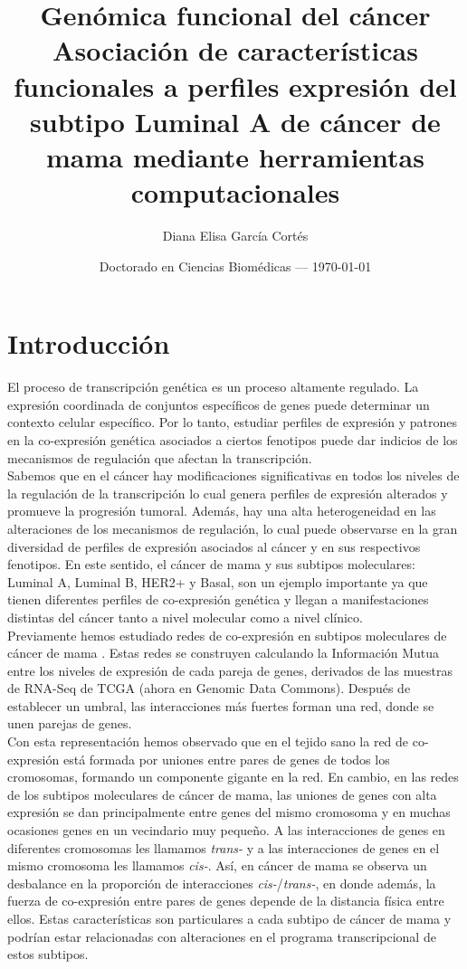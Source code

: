 \documentclass{article}
\title{Genómica funcional del cáncer \\
\large Asociación de características funcionales a perfiles expresión del subtipo Luminal A de cáncer de mama mediante herramientas computacionales} %
\author{Diana Elisa García Cortés\\} %
\date{Doctorado en Ciencias Biomédicas --- \today} %
\begin{document}
\maketitle %


\section*{Introducción}

El proceso de transcripción genética es un proceso altamente regulado. La expresión coordinada de conjuntos específicos de genes puede determinar un contexto celular específico. Por lo tanto, estudiar perfiles de expresión y patrones en la co-expresión genética asociados a ciertos fenotipos puede dar indicios de los mecanismos de regulación que afectan la transcripción. \\
Sabemos que en el cáncer hay modificaciones significativas en todos los niveles de la regulación de la transcripción lo cual genera perfiles de expresión alterados y promueve la progresión tumoral. Además, hay una alta heterogeneidad en las alteraciones de los mecanismos de regulación, lo cual puede observarse en la gran diversidad de perfiles de expresión asociados al cáncer y en sus respectivos fenotipos. En este sentido, el cáncer de mama y sus subtipos moleculares: Luminal A, Luminal B, HER2+ y Basal, son un ejemplo importante ya que tienen diferentes perfiles de co-expresión genética y llegan a manifestaciones distintas del cáncer tanto a nivel molecular como a nivel clínico. \\
Previamente hemos estudiado redes de co-expresión en subtipos moleculares de cáncer de mama \cite{gdc}. Estas redes se construyen calculando la Información Mutua entre los niveles de expresión de cada pareja de genes, derivados de las muestras de RNA-Seq de TCGA (ahora en Genomic Data Commons). Después de establecer un umbral, las interacciones más fuertes forman una red, donde se unen parejas de genes. \\
Con esta representación hemos observado que en el tejido sano la red de co-expresión está formada por uniones entre pares de genes de todos los cromosomas, formando un componente gigante en la red. En cambio, en las redes de los subtipos moleculares de cáncer de mama, las uniones de genes con alta expresión se dan principalmente entre genes del mismo cromosoma y en muchas ocasiones genes en un vecindario muy pequeño. A las interacciones de genes en diferentes cromosomas les llamamos \textit{trans-} y a las interacciones de genes en el mismo cromosoma les llamamos \textit{cis-}. Así, en cáncer de mama se observa un desbalance en la proporción de interacciones \textit{cis-}/\textit{trans-}, en donde además, la fuerza de co-expresión entre pares de genes depende de la distancia física entre ellos. Estas características son particulares a cada subtipo de cáncer de mama y podrían estar relacionadas con alteraciones en el programa transcripcional de estos subtipos. \\
\end{document}
